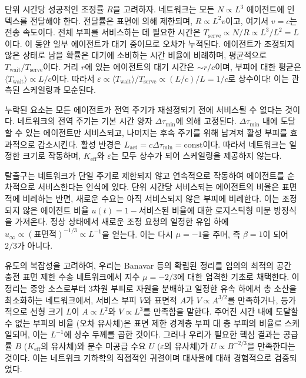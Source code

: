 \documentclass[11pt,a4paper]{article}
\begin{document}
	단위 시간당 성공적인 조정률 \(R\)을 고려하자. 네트워크는 모든 \(N \propto L^3\) 에이전트에 인덱스를 전달해야 한다. 전달률은 표면에 의해 제한되며, \(R \propto L^2 v\)이고, 여기서 \(v = c\)는 전송 속도이다. 전체 부피를 서비스하는 데 필요한 시간은 \(T_{\mathrm{serve}} \propto N/R \propto L^3/L^2 = L\)이다. 이 동안 일부 에이전트가 대기 중이므로 오차가 누적된다. 에이전트가 조정되지 않은 상태로 남을 확률은 대기에 소비하는 시간 비율에 비례하며, 평균적으로 \(T_{\mathrm{wait}}/T_{\mathrm{serve}}\)이다. 거리 \(r\)에 있는 에이전트의 대기 시간은 \(\sim r/c\)이며, 부피에 대한 평균은 \(\langle T_{\mathrm{wait}} \rangle \propto L/c\)이다. 따라서 \(\varepsilon \propto \langle T_{\mathrm{wait}} \rangle/T_{\mathrm{serve}} \propto (L/c)/L = 1/c\)로 상수이다! 이는 관측된 스케일링과 모순된다.
	
	누락된 요소는 모든 에이전트가 전역 주기가 재설정되기 전에 서비스될 수 없다는 것이다. 네트워크의 전역 주기는 기본 시간 양자 \(\Delta\tau_{\min}\)에 의해 고정된다. \(\Delta\tau_{\min}\) 내에 도달할 수 있는 에이전트만 서비스되고, 나머지는 후속 주기를 위해 남겨져 활성 부피를 효과적으로 감소시킨다. 활성 반경은 \(L_{\mathrm{act}} = c\Delta\tau_{\min} = \text{const}\)이다. 따라서 네트워크는 일정한 크기로 작동하며, \(K_{\mathrm{eff}}\)와 \(\varepsilon\)는 모두 상수가 되어 스케일링을 제공하지 않는다.
	
	탈출구는 네트워크가 단일 주기로 제한되지 않고 연속적으로 작동하여 에이전트를 순차적으로 서비스한다는 인식에 있다. 단위 시간당 서비스되는 에이전트의 비율은 표면적에 비례하는 반면, 새로운 수요는 아직 서비스되지 않은 부피에 비례한다. 이는 조정되지 않은 에이전트 비율 \(u(t) = 1 - \text{서비스된 비율}\)에 대한 로지스틱형 미분 방정식을 가져온다. 정상 상태에서 새로운 조정 요청의 일정한 유입 하에 \(u_{\infty} \propto (\text{표면적})^{-1/3} \propto L^{-1}\)을 얻는다. 이는 다시 \(\mu = -1\)을 주며, 즉 \(\beta = 1\)이 되어 \(2/3\)가 아니다.
	
	유도의 복잡성을 고려하여, 우리는 Banavar 등의 확립된 정리를 임의의 최적의 공간 충전 표면 제한 수송 네트워크에서 지수 \(\mu = -2/3\)에 대한 엄격한 기초로 채택한다. 이 정리는 중앙 소스로부터 3차원 부피로 자원을 분배하고 일정한 유속 하에서 총 소산을 최소화하는 네트워크에서, 서비스 부피 \(V\)와 표면적 \(A\)가 \(V \propto A^{3/2}\)를 만족하거나, 등가적으로 선형 크기 \(L\)이 \(A \propto L^2\)와 \(V \propto L^3\)를 만족함을 말한다. 주어진 시간 내에 도달할 수 없는 부피의 비율 (오차 유사체)은 표면 제한 경계층 부피 대 총 부피의 비율로 스케일되며, 이는 \(L^{-1}\)에 상수 두께를 곱한 것이다. 그러나 우리가 필요한 핵심 결과는 공급률 \(B\) (\(K_{\mathrm{eff}}\)의 유사체)와 분수 미공급 수요 \(U\) (\(\varepsilon\)의 유사체)가 \(U \propto B^{-2/3}\)을 만족한다는 것이다. 이는 네트워크 기하학의 직접적인 귀결이며 대사율에 대해 경험적으로 검증되었다.
	
\end{document}
